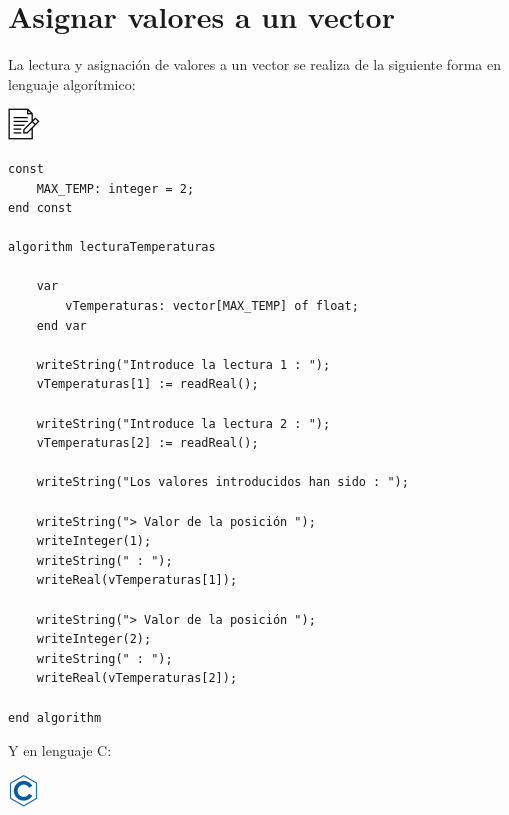 \documentclass[
]{book}
\begin{document}
\hypertarget{asignar-valores-a-un-vector}{%
\section{Asignar valores a un vector}\label{asignar-valores-a-un-vector}}

La lectura y asignación de valores a un vector se realiza de la siguiente forma en lenguaje algorítmico:

\includegraphics{./img/alg.png}

\begin{verbatim}
const
    MAX_TEMP: integer = 2;
end const

algorithm lecturaTemperaturas

    var
        vTemperaturas: vector[MAX_TEMP] of float;
    end var

    writeString("Introduce la lectura 1 : ");
    vTemperaturas[1] := readReal();

    writeString("Introduce la lectura 2 : ");
    vTemperaturas[2] := readReal();
    
    writeString("Los valores introducidos han sido : ");
    
    writeString("> Valor de la posición ");
    writeInteger(1);
    writeString(" : ");
    writeReal(vTemperaturas[1]);
    
    writeString("> Valor de la posición ");
    writeInteger(2);
    writeString(" : ");
    writeReal(vTemperaturas[2]);

end algorithm
\end{verbatim}

Y en lenguaje C:

\includegraphics{./img/c.png}
\end{document}
